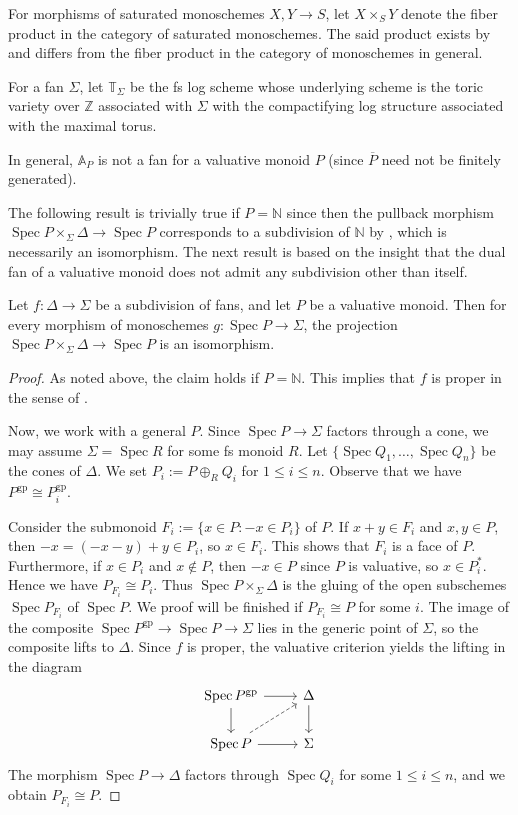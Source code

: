 \documentclass[10pt]{amsart}
\newcommand{\A}{\mathbb{A}}
\newcommand{\N}{\mathbb{N}}
\newcommand{\T}{\mathbb{T}}
\newcommand{\Z}{\mathbb{Z}}
\newcommand{\gp}{\mathrm{gp}}
\DeclareMathOperator{\Spec}{Spec}
\newcommand{\ol}{\overline}
\begin{document}
For morphisms of saturated monoschemes $X,Y\to S$,
let $X\times_S Y$ denote the fiber product in the category of saturated monoschemes.
The said product exists by \cite[Proposition II.1.3.5]{Ogu} and differs from the 
fiber product in the category of monoschemes in general.

For a fan $\Sigma$,
let $\T_\Sigma$ be the fs log scheme whose underlying scheme is the toric variety over $\Z$ associated with $\Sigma$ with the compactifying log structure associated with the maximal torus.

\begin{remark}\label{exm:notafan}
In general, $\A_{P}$ is not a fan for a valuative monoid $P$
(since $\ol{P}$ need not be finitely generated). 
 \end{remark}

The following result is trivially true if $P=\N$ since then the pullback morphism $\Spec{P}\times_{\Sigma}\Delta\to \Spec{P}$ corresponds to a subdivision of $\N$ by 
\cite[Lemma A.3.11]{logDM}, which is necessarily an isomorphism. 
The next result is based on the insight that the dual fan of a valuative monoid
does not admit any subdivision other than itself.

\begin{theorem}\label{thm:subdivisionsoffans}
Let $f \colon \Delta\to \Sigma$ be a subdivision of fans, and let $P$ be a valuative monoid.
Then for every morphism of monoschemes $g \colon \Spec{P}\to \Sigma$,
the projection $\Spec{P}\times_{\Sigma}\Delta\to \Spec{P}$ is an isomorphism.
\end{theorem}
\begin{proof}
As noted above, the claim holds if $P=\N$. 
This implies that $f$ is proper in the sense of \cite[Definition II.1.6.1]{Ogu}.

Now, we work with a general $P$.
Since $\Spec{P}\to \Sigma$ factors through a cone, we may assume $\Sigma=\Spec{R}$ for some fs monoid $R$.
Let $\{\Spec{Q_1},\ldots,\Spec{Q_n}\}$ be the cones of $\Delta$.
We set $P_i:=P\oplus_R Q_i$ for $1\leq i\leq n$.
Observe that we have $P^\gp\cong P_i^\gp$.

Consider the submonoid $F_i:=\{x\in P:-x\in P_i\}$ of $P$.
If $x+y\in F_i$ and $x,y\in P$,
then $-x=(-x-y)+y\in P_i$, so $x\in F_i$.
This shows that $F_i$ is a face of $P$.
Furthermore, if $x\in P_i$ and $x\notin P$, then $-x\in P$ since $P$ is valuative, so $x\in P_i^*$.
Hence we have $P_{F_i}\cong P_i$.
Thus $\Spec{P}\times_\Sigma \Delta$ is the gluing of the open subschemes 
$\Spec{P_{F_i}}$ of $\Spec{P}$.
We proof will be finished if $P_{F_i}\cong P$ for some $i$.
The image of the composite $\Spec P^\gp\to \Spec P\to \Sigma$ lies in the generic point of $\Sigma$, so the composite lifts to $\Delta$.
Since $f$ is proper,
the valuative criterion \cite[Theorem II.1.6.3]{Ogu} yields the lifting in the diagram
\[
\begin{tikzcd}
\Spec{P^\gp}\ar[d]\ar[r]&
\Delta\ar[d]
\\
\Spec{P}\ar[ru,dashed]\ar[r]&
\Sigma
\end{tikzcd}
\]
The morphism $\Spec{P}\to \Delta$ factors through $\Spec{Q_i}$ for some $1\leq i\leq n$, 
and we obtain $P_{F_i}\cong P$.
\end{proof}
\end{document}
